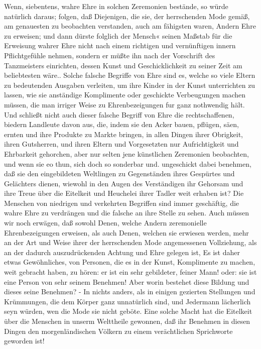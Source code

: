 Wenn, siebentens, wahre Ehre in solchen Zeremonien bestände, so würde natürlich daraus; folgen, daß Diejenigen, die sie, der herrschenden Mode gemäß, am genauesten zu beobachten verstanden, auch am fähigsten waren, Andern Ehre zu erweisen; und dann dürste folglich der Mensch« seinen Maßstab für die Erweisung wahrer Ehre nicht nach einem richtigen und vernünftigen innern Pflichtgefühle nehmen, sondern er müßte ihn nach der Vorschrift des Tanzmeisters einrichten, dessen Kunst und Geschicklichkeit zu seiner Zeit am beliebtesten wäre.. Solche falsche Begriffe von Ehre sind es, welche so viele Eltern zu bedeutenden Ausgaben verleiten, um ihre Kinder in der Kunst unterrichten zu lassen, wie sie anständige Komplimente oder geschickte Verbeugungen machen müssen, die man irriger Weise zu Ehrenbezeigungen fur ganz nothwendig hält. Und schließt nicht auch dieser falsche Begriff von Ehre die rechtschaffenen, biedern Landleute davon aus, die, indem sie den Acker bauen, pflügen, säen, ernten und ihre Produkte zu Markte bringen, in allen Dingen ihrer Obrigkeit, ihren Gutsherren, und ihren Eltern und Vorgesetzten nur Aufrichtigkeit und Ehrbarkeit gehorchen, aber nur selten jene künstlichen Zeremonien beobachten, und wenn sie eo thun, sich doch so sonderbar und. ungeschickt dabei benehmen, daß sie den eingebildeten Weltlingen zu Gegenständen ihres Gespürtes und Gelächters dienen, wiewohl in den Augen des Verständigen ihr Gehorsam und ihre Treue über die Eitelkeit und Heuchelei ihrer Tadler weit erhaben ist? Die Menschen von niedrigen und verkehrten Begriffen sind immer geschäftig, die wahre Ehre zu verdrängen und die falsche an ihre Stelle zu sehen. Auch müssen wir noch erwägen, daß sowohl Denen, welche Andern zeremonielle Ehrenbezeigungen erweisen, als auch Denen, welchen sie erwiesen werden, mehr an der Art und Weise ihrer der herrschenden Mode angemessenen Vollziehung, als an der dadurch auszudrückenden Achtung und Ehre gelegen ist, Es ist daher etwas Gewöhnliches, von Personen, die es in der Kunst, Komplimente zu machen, weit gebracht haben, zu hören: er ist ein sehr gebildeter, feiner Mann! oder: sie ist eine Person von sehr seinem Benehmen! Aber worin bestehet diese Bildung und dieses seine Benehmen? - In nichts anders, als in einigen gezierten Stellungen und Krümmungen, die dem Körper ganz unnatürlich sind, und Jedermann lächerlich seyn würden, wen die Mode sie nicht geböte. Eine solche Macht hat die Eitelkeit über die Menschen in unserm Welttheile gewonnen, daß ihr Benehmen in diesen Dingen den morgenländischen Völkern zu einem verächtlichen Sprichworte geworden ist!

